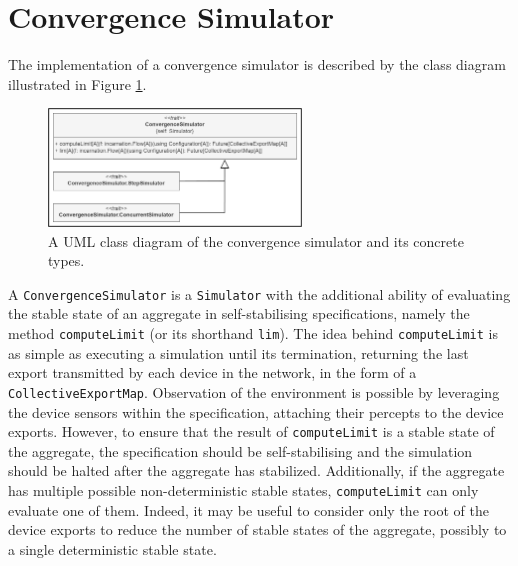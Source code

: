 
\section{Convergence Simulator}
\label{section:implementation:convergence-simulator}

The implementation of a convergence simulator is described by the class diagram
illustrated in Figure \ref{figure:convergence-simulator-class-diagram}.

\begin{figure}[!ht]
  \centering
  \includegraphics[width=0.60\textwidth]{resources/figures/convergence-simulator-class-diagram.png}
  \caption{
    A UML class diagram of the convergence simulator
    and its concrete types.
  }
  \label{figure:convergence-simulator-class-diagram}
\end{figure}

A \texttt{ConvergenceSimulator} is a \texttt{Simulator} with the additional
ability of evaluating the stable state of an aggregate in self-stabilising
specifications, namely the method \texttt{computeLimit} (or its shorthand
\texttt{lim}). The idea behind \texttt{computeLimit} is as simple as executing
a simulation until its termination, returning the last export transmitted by
each device in the network, in the form of a \texttt{CollectiveExportMap}.
Observation of the environment is possible by leveraging the device sensors
within the specification, attaching their percepts to the device exports.
However, to ensure that the result of \texttt{computeLimit} is a stable state
of the aggregate, the specification should be self-stabilising and the
simulation should be halted after the aggregate has stabilized. Additionally,
if the aggregate has multiple possible non-deterministic stable states,
\texttt{computeLimit} can only evaluate one of them. Indeed, it may be useful
to consider only the root of the device exports to reduce the number of stable
states of the aggregate, possibly to a single deterministic stable state.

